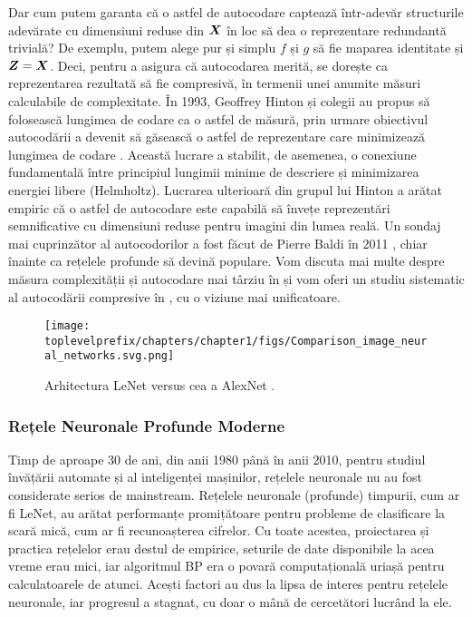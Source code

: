 \documentclass[../../book-main_ro.tex]{subfiles}
\begin{document}
Dar cum putem garanta că o astfel de autocodare captează într-adevăr structurile adevărate cu dimensiuni reduse din $\bm{X}$ în loc să dea o reprezentare redundantă trivială? De exemplu, putem alege pur și simplu $f$ și $g$ să fie maparea identitate și $\bm{Z} = \bm{X}$. Deci, pentru a asigura că autocodarea merită, se dorește ca reprezentarea rezultată să fie compresivă, în termenii unei anumite măsuri calculabile de complexitate. În 1993, Geoffrey Hinton și colegii au propus să folosească lungimea de codare ca o astfel de măsură, prin urmare obiectivul autocodării a devenit să găsească o astfel de reprezentare care minimizează lungimea de codare \cite{Hinton-1993}. Această lucrare a stabilit, de asemenea, o conexiune fundamentală între principiul lungimii minime de descriere \cite{Rissanen-1978} și minimizarea energiei libere (Helmholtz). Lucrarea ulterioară \cite{Hinton504} din grupul lui Hinton a arătat empiric că o astfel de autocodare este capabilă să învețe reprezentări semnificative cu dimensiuni reduse pentru imagini din lumea reală. Un sondaj mai cuprinzător al autocodorilor a fost făcut de Pierre Baldi în 2011 \cite{Baldi2011}, chiar înainte ca rețelele profunde să devină populare. Vom discuta mai multe despre măsura complexității și autocodare mai târziu în  și vom oferi un studiu sistematic al autocodării compresive în , cu o viziune mai unificatoare.


\begin{figure}
    \centering
    \texttt{[image: \\toplevelprefix/chapters/chapter1/figs/Comparison\_image\_neural\_networks.svg.png]}
    \caption{Arhitectura LeNet \cite{LeCun-1989} versus cea a AlexNet \cite{krizhevsky2012imagenet}.}
    \label{fig:LeNet-AlexNet}
\end{figure}


\subsubsection{Rețele Neuronale Profunde Moderne}
Timp de aproape 30 de ani, din anii 1980 până în anii 2010, pentru studiul învățării automate și al inteligenței mașinilor, rețelele neuronale nu au fost considerate serios de mainstream. Rețelele neuronale (profunde) timpurii, cum ar fi LeNet, au arătat performanțe promițătoare pentru probleme de clasificare la scară mică, cum ar fi recunoașterea cifrelor. Cu toate acestea, proiectarea și practica rețelelor erau destul de empirice, seturile de date disponibile la acea vreme erau mici, iar algoritmul BP era o povară computațională uriașă pentru calculatoarele de atunci. Acești factori au dus la lipsa de interes pentru rețelele neuronale, iar progresul a stagnat, cu doar o mână de cercetători lucrând la ele.
\end{document}
